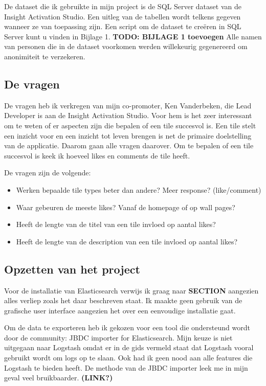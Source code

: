 De dataset die ik gebruikte in mijn project is de SQL Server dataset van de Insight Activation Studio. Een uitleg van de tabellen wordt telkens gegeven wanneer ze van toepassing zijn. Een script om de dataset te creëren in SQL Server kunt u vinden in Bijlage 1. \textbf{TODO: BIJLAGE 1 toevoegen} Alle namen van personen die in de dataset voorkomen werden willekeurig gegenereerd om anonimiteit te verzekeren.

\subsection{De vragen}
De vragen heb ik verkregen van mijn co-promoter, Ken Vanderbeken, die Lead Developer is aan de Insight Activation Studio. Voor hem is het zeer interessant om te weten of er aspecten zijn die bepalen of een tile succesvol is. Een tile stelt een inzicht voor en een inzicht tot leven brengen is net de primaire doelstelling van de applicatie. Daarom gaan alle vragen daarover. Om te bepalen of een tile succesvol is keek ik hoeveel likes en comments de tile heeft.

De vragen zijn de volgende:
\begin{itemize}
	\item Werken bepaalde tile types beter dan andere? Meer response? (like/comment) 
	\item Waar gebeuren de meeste likes? Vanaf de homepage of op wall pages?
	\item Heeft de lengte van de titel van een tile invloed op aantal likes? 
	\item Heeft de lengte van de description van een tile invloed op aantal likes? 
\end{itemize}

\subsection{Opzetten van het project}

Voor de installatie van Elasticsearch verwijs ik graag naar \textbf{SECTION} aangezien alles verliep zoals het daar beschreven staat. Ik maakte geen gebruik van de grafische user interface aangezien het over een eenvoudige installatie gaat.

Om de data te exporteren heb ik gekozen voor een tool die ondersteund wordt door de community: JBDC importer for Elasticsearch. Mijn keuze is niet uitgegaan naar Logstash omdat er in de gids vermeld staat dat Logstash vooral gebruikt wordt om logs op te slaan. Ook had ik geen nood aan alle features die Logstash te bieden heeft. De methode van de JBDC importer leek me in mijn geval veel bruikbaarder. \textbf{(LINK?)} 

